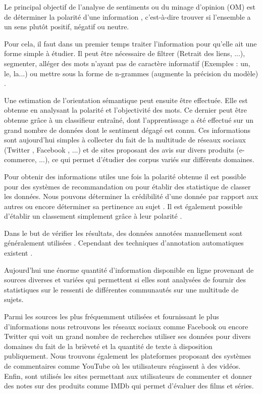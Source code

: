 \documentclass[8pt]{article}
\begin{document}
\begin{multicols}{2}
\par Le principal objectif de l’analyse de sentiments ou du minage d’opinion (OM) est de déterminer la polarité d’une information \cite{ressource6}, c’est-à-dire trouver si l’ensemble a un sens plutôt positif, négatif ou neutre.
\par Pour cela, il faut dans un premier temps traiter l’information pour qu’elle ait une forme simple à étudier. Il peut être nécessaire de filtrer (Retrait des liens, ...), segmenter, alléger des mots n’ayant pas de caractère informatif (Exemples : un, le, la...) ou mettre sous la forme de n-grammes (augmente la précision du modèle) \cite{ressource10}.
\par Une estimation de l’orientation sémantique peut ensuite être effectuée. Elle est obtenue en analysant la polarité et l’objectivité des mots. Ce dernier peut être obtenue grâce à un classifieur entraîné, dont l’apprentissage a été effectué sur un grand nombre de données dont le sentiment dégagé est connu. Ces informations sont aujourd’hui  simples à collecter \cite{ressource10} du fait de la multitude de réseaux sociaux (Twitter \cite{ressource11}, Facebook \cite{ressource27}, ...) et de sites proposant des avis sur divers produits (e-commerce, ...), ce qui permet d’étudier des corpus variés sur différents domaines.
\par Pour obtenir des informations utiles une fois la polarité obtenue il est possible pour des systèmes de recommandation ou pour établir des statistique de classer les données. Nous pouvons déterminer la crédibilité d’une donnée par rapport aux autres \cite{ressource28} ou encore déterminer sa pertinence au sujet \cite{ressource18}. Il est également possible d’établir un classement  simplement grâce à leur polarité \cite{ressource4}.
\par Dans le but de vérifier les résultats, des données annotées manuellement sont généralement utilisées \cite{ressource30}. Cependant des techniques d’annotation automatiques existent \cite{ressource19}.

\par Aujourd'hui une énorme quantité d’information disponible en ligne provenant de sources diverses et variées qui permettent si elles sont analysées de fournir des statistiques sur le ressenti de différentes communautés sur une multitude de sujets.
\par Parmi les sources les plus fréquemment utilisées et fournissant le plus d’informations nous retrouvons les réseaux sociaux comme Facebook \cite{ressource27} ou encore Twitter \cite{ressource10} \cite{ressource11} \cite{ressource14} \cite{ressource17} \cite{ressource19} \cite{ressource22} \cite{ressource23} \cite{ressource24} \cite{ressource28} qui voit un grand nombre de recherches utiliser ses données pour divers domaines du fait de la brièveté et la quantité de texte à disposition publiquement. Nous trouvons également les plateformes proposant des systèmes de commentaires comme YouTube\cite{ressource30}\cite{ressource22} où les utilisateurs réagissent à des vidéos. Enfin, sont utilisés les sites permettant aux utilisateurs de commenter et donner des notes sur des produits comme IMDb \cite{ressource1} qui permet d’évaluer des films et séries.



\end{multicols}
\end{document}
